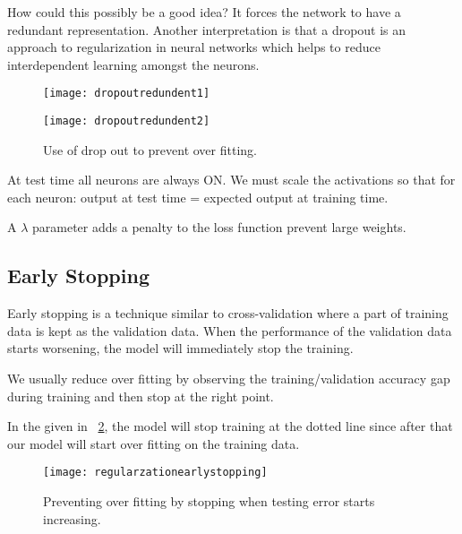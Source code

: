 How could this possibly be a good idea?  It forces the network to have a redundant representation.  Another interpretation is that a dropout is an approach to regularization in neural networks which helps to reduce interdependent learning amongst the neurons.

	\begin{figure}[tbp]
		\begin{minipage}[t]{0.475\textwidth}
			\centering
			\texttt{[image: dropoutredundent1]}
			\label{fig:dropoutredundent1}
		\end{minipage}
		\hfill
		\begin{minipage}[t]{0.475\textwidth}
			\centering
			\texttt{[image: dropoutredundent2]}
			\label{fig:dropoutredundent2}
		\end{minipage}
		\caption[Use of drop out to prevent over fitting]{Use of drop out to prevent over fitting.}
	\end{figure}

At test time all neurons are always ON.  We must scale the activations so that for each neuron: output at test time = expected output at training time.

A $\lambda$ parameter adds a penalty to the loss function prevent large weights.

	\subsection{Early Stopping}
	\begin{bulletedlist}
		\item Early stopping is a technique similar to cross-validation where a part of training data is kept as the validation data. When the performance of the validation data starts worsening, the model will immediately stop the training.
		\item We usually reduce over fitting by observing the training/validation accuracy gap during training and then stop at the right point.
		\item In the given in \figurename~\ref{fig:regularzationearlystopping}, the model will stop training at the dotted line since after that our model will start over fitting on the training data.
	\end{bulletedlist}

 	\begin{figure}[h]
		\centering
		\texttt{[image: regularzationearlystopping]}
		\caption[Preventing over fitting by stopping when testing error starts increasing]{Preventing over fitting by stopping when testing error starts increasing.}
		\label{fig:regularzationearlystopping}
	\end{figure}

